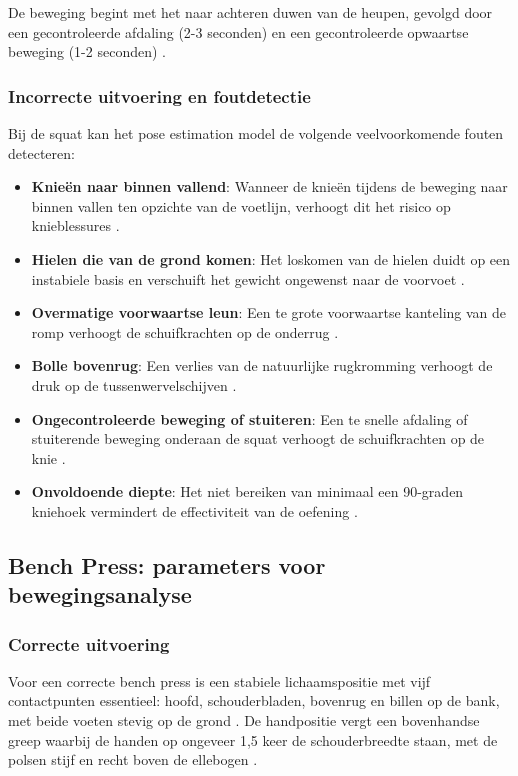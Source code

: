 De beweging begint met het naar achteren duwen van de heupen, gevolgd door een gecontroleerde afdaling (2-3 seconden) en een gecontroleerde opwaartse beweging (1-2 seconden) \autocite{CzaprowskiEtAl2012}.

\subsubsection{Incorrecte uitvoering en foutdetectie}
Bij de squat kan het pose estimation model de volgende veelvoorkomende fouten detecteren:

\begin{itemize}
    \item \textbf{Knieën naar binnen vallend}: Wanneer de knieën tijdens de beweging naar binnen vallen ten opzichte van de voetlijn, verhoogt dit het risico op knieblessures \autocite{BengtssonEtAl2018}. 
    
    \item \textbf{Hielen die van de grond komen}: Het loskomen van de hielen duidt op een instabiele basis en verschuift het gewicht ongewenst naar de voorvoet \autocite{CzaprowskiEtAl2012}. 
    
    \item \textbf{Overmatige voorwaartse leun}: Een te grote voorwaartse kanteling van de romp verhoogt de schuifkrachten op de onderrug \autocite{BengtssonEtAl2018}. 
    
    \item \textbf{Bolle bovenrug}: Een verlies van de natuurlijke rugkromming verhoogt de druk op de tussenwervelschijven \autocite{CzaprowskiEtAl2012}. 
    
    \item \textbf{Ongecontroleerde beweging of stuiteren}: Een te snelle afdaling of stuiterende beweging onderaan de squat verhoogt de schuifkrachten op de knie \autocite{BengtssonEtAl2018}. 
    
    \item \textbf{Onvoldoende diepte}: Het niet bereiken van minimaal een 90-graden kniehoek vermindert de effectiviteit van de oefening \autocite{ComfortEtAl2018}. 
\end{itemize}

\subsection{Bench Press: parameters voor bewegingsanalyse}

\subsubsection{Correcte uitvoering}
Voor een correcte bench press is een stabiele lichaamspositie met vijf contactpunten essentieel: hoofd, schouderbladen, bovenrug en billen op de bank, met beide voeten stevig op de grond \autocite{KrolEtAl2010}. 
De handpositie vergt een bovenhandse greep waarbij de handen op ongeveer 1,5 keer de schouderbreedte staan, met de polsen stijf en recht boven de ellebogen \autocite{NoteboomEtAl2024}.

